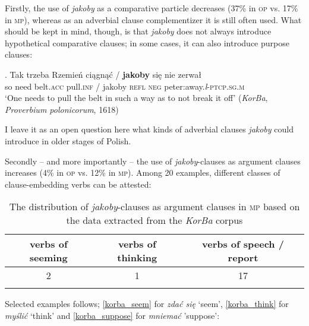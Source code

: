 \documentclass[output=paper
,modfonts
,nonflat]{langsci/langscibook}
\newcommand{\glossformat}[1]{\textsc{#1}}
\newcommand{\acc}{\glossformat{acc}\xspace}
\newcommand{\infv}{\glossformat{inf}\xspace}
\newcommand{\negation}{\glossformat{neg}\xspace}
\newcommand{\lptcp}{\emph{l}\glossformat{-ptcp}\xspace}
\newcommand{\masc}{\glossformat{m}\xspace}
\newcommand{\refl}{\glossformat{refl}\xspace}
\newcommand{\sg}{\glossformat{sg}\xspace}
\newcommand{\nquelle}[1]{\newline\phantom{x}\hfill(#1)}
\begin{document}
Firstly, the use of \emph{jakoby} as a comparative particle decreases (37\% in \textsc{op} vs. 17\% in \textsc{mp}), whereas as an adverbial clause complementizer it is still often used. What should be kept in mind, though, is that \emph{jakoby} does not always introduce hypothetical comparative clauses; in some cases, it can also introduce purpose clauses: 

\exg.		Tak trzeba Rzemień ciągnąć / \textbf{jakoby} się nie zerwał \\
		so need belt.{\acc} pull.{\infv} / jakoby {\refl} {\negation} peter:away.{\lptcp}.{\sg}.{\masc} \\
		`One needs to pull the belt in such a way as to not break it off' \nquelle{\emph{KorBa}, \emph{Proverbium polonicorum}, 1618} 	     

I leave it as an open question here what kinds of adverbial clauses \emph{jakoby} could introduce in older stages of Polish. 

Secondly – and more importantly – the use of \emph{jakoby}-clauses as argument clauses increases (4\% in \textsc{op} vs. 12\% in \textsc{mp}). Among 20 examples, different classes of clause-embedding verbs can be attested: 

 \begin{table}[h] \center \begin{tabular}{ccc} 
\lsptoprule
verbs of seeming & verbs of thinking & verbs of speech / report \\
\midrule
2 & 1 & 17  \\
 \lspbottomrule
\end{tabular}
\caption{The distribution of \emph{jakoby}-clauses as argument clauses in \textsc{mp} based on the data extracted from the \emph{KorBa} corpus}
\end{table}

\noindent Selected examples follows; \ref{korba_seem} for \emph{zdać się} `seem', \ref{korba_think} for \emph{myślić} `think' and \ref{korba_suppose} for \emph{mniemać} 'suppose':     
\end{document}
